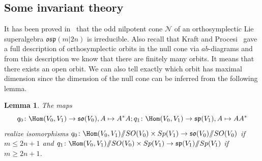 \documentclass[12pt]{amsart}
\newtheorem{lem}[thm]{Lemma}
\theoremstyle{definition}
\theoremstyle{remark}
\numberwithin{equation}{subsection}
\begin{document}
\subsection{Some invariant theory}
It has been proved in~\cite{GL} that the odd nilpotent cone $\mathcal{N}$ of an orthosymplectic Lie
superalgebra $\mathfrak{osp}(m|2n)$ is irreducible. Also recall that Kraft and Procesi~\cite{KP} gave a full description of orthosymplectic orbits in the null cone via $ab$-diagrams and from this description we know that there are finitely many orbits. It means that there exists an open orbit. We can also tell exactly which orbit has maximal dimension since the dimension of the null cone can be inferred from the following lemma.\\
\begin{lem}
  \label{lem3}
  The maps
\begin{equation}
    q_0\colon  \Hom(V_0,V_1) \rightarrow \mathfrak{so}(V_0), A \mapsto A^* A; q_1\colon  \Hom(V_0,V_1) \rightarrow \mathfrak{sp}(V_1), A \mapsto AA^*
\end{equation}
realize isomorphisms $q_0\colon  \Hom(V_0,V_1)/\!\!/SO(V_0)\times Sp(V_1) \rightarrow \mathfrak{so}(V_0)/\!\!/SO(V_0) $ if $m\le 2n+1$ and $q_1\colon  \Hom(V_0,V_1)/\!\!/SO(V_0)\times Sp(V_1) \rightarrow \mathfrak{sp}(V_1)/\!\!/Sp(V_1) $ if $m\ge 2n+1$.
\end{lem}
\end{document}

